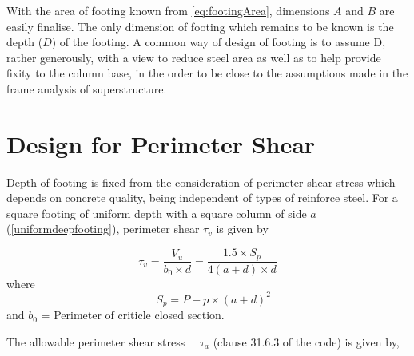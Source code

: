 
With the area of footing known from \equmacro \ref{eq:footingArea},
dimensions $A$ and $B$ are easily finalise.  The only dimension of footing
which remains to be known is the depth ($D$) of the footing.  A common way
of design of footing is to assume D, rather generously, with a view to
reduce steel area as well as to help provide fixity to the column base, in
the order to be close to the assumptions made in the frame analysis of
superstructure.

\section{Design for Perimeter Shear} Depth of footing is fixed from the
consideration of perimeter shear stress which depends on concrete quality,
being independent of types of reinforce steel. For a square footing of
uniform depth with a square column of side $a$ (\figmacro \ref{uniformdeepfooting}), perimeter shear
$\tau_{v}$ is given by

\begin{equation}
\label{eq:perimeterShearStress}
\tau_{v} = \frac{V_{u}} {{b_{0}} \times d} 
=\frac{1.5 \times S_{p}} {4(a + d) \times d} 
\end{equation}
where 
\begin{equation}
\label{eq:perimeterShearForce}
\quad S_{p} = P - p \times (a + d)^2
\end{equation}
and $b_0$ = Perimeter of criticle closed section.

The allowable perimeter shear stress $\quad{\tau_{a}}$ (clause 31.6.3 of
the code) is given by,


